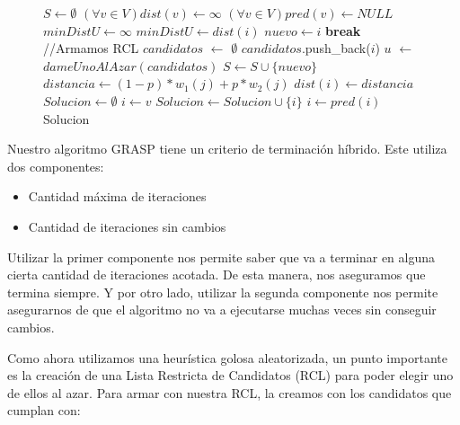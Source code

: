 \begin{center}
 \begin{figure}[H]
  \begin{pseudo}
    \State $S \leftarrow \emptyset$
    \State $(\forall v \in V) dist(v) \leftarrow \infty$
    \State $(\forall v \in V) pred(v) \leftarrow NULL$
    \State $minDistU \leftarrow \infty$
	\State $minDistU \leftarrow dist(i)$
	\State $nuevo \leftarrow i$
      \EndIf
    \EndFor
      \State \textbf{break}
    \EndIf
    \State //Armamos RCL
    \State $candidatos$ $\leftarrow$ $\emptyset$
	\State $candidatos$.push\_back($i$)
      \EndIf
    \EndFor
    \State $u$ $\leftarrow$ $dameUnoAlAzar(candidatos)$
    \State $S \leftarrow S \cup \{nuevo\}$
      \State $distancia \leftarrow (1-p)*w_1(j) + p*w_2(j)$
	\State $dist(i) \leftarrow distancia$
      \EndIf
    \EndFor
    \EndWhile
    \State $Solucion \leftarrow \emptyset$
    \State $i \leftarrow v$
      \State $Solucion \leftarrow Solucion \cup \{i\}$
      \State $i \leftarrow pred(i)$
    \EndWhile
    \Return Solucion
    \EndProcedure
  \end{pseudo}
 \end{figure}
\end{center}

Nuestro algoritmo GRASP tiene un criterio de terminación híbrido. Este utiliza dos componentes: 

\begin{itemize}
 \item Cantidad máxima de iteraciones
 \item Cantidad de iteraciones sin cambios
\end{itemize}


Utilizar la primer componente nos permite saber que va a terminar en alguna cierta cantidad de iteraciones acotada. De esta manera, nos aseguramos que termina siempre. Y por otro lado, utilizar la segunda componente nos permite asegurarnos de que el algoritmo no va a ejecutarse muchas veces sin conseguir cambios.

Como ahora utilizamos una heurística golosa aleatorizada, un punto importante es la creación de una Lista Restricta de Candidatos (RCL) para poder elegir uno de ellos al azar. Para armar con nuestra RCL, la creamos con los candidatos que cumplan con:

